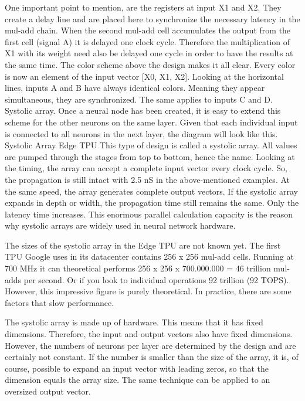   
One important point to mention, are the registers at input X1 and X2. They create a delay line and are placed here to synchronize the necessary latency in the mul-add chain. When the second mul-add cell accumulates the output from the first cell (signal A) it is delayed one clock cycle. Therefore the multiplication of X1 with its weight need also be delayed one cycle in order to have the results at the same time. The color scheme above the design makes it all clear. Every color is now an element of the input vector [X0, X1, X2]. Looking at the horizontal lines, inputs A and B have always identical colors. Meaning they appear simultaneous, they are synchronized. The same applies to inputs C and D.
Systolic array.
Once a neural node has been created, it is easy to extend this scheme for the other neurons on the same layer. Given that each individual input is connected to all neurons in the next layer, the diagram will look like this.
Systolic Array Edge TPU
This type of design is called a systolic array. All values are pumped through the stages from top to bottom, hence the name. Looking at the timing, the array can accept a complete input vector every clock cycle. So, the propagation is still intact with 2.5 nS in the above-mentioned examples. At the same speed, the array generates complete output vectors. If the systolic array expands in depth or width, the propagation time still remains the same. Only the latency time increases. This enormous parallel calculation capacity is the reason why systolic arrays are widely used in neural network hardware.
 
The sizes of the systolic array in the Edge TPU are not known yet. The first TPU Google uses in its datacenter contains 256 x 256 mul-add cells. Running at 700 MHz it can theoretical performs 256 x 256 x 700.000.000 = 46 trillion mul-adds per second. Or if you look to individual operations 92 trillion (92 TOPS). However, this impressive figure is purely theoretical. In practice, there are some factors that slow performance.
 
The systolic array is made up of hardware. This means that it has fixed dimensions. Therefore, the input and output vectors also have fixed dimensions. However, the numbers of neurons per layer are determined by the design and are certainly not constant. If the number is smaller than the size of the array, it is, of course, possible to expand an input vector with leading zeros, so that the dimension equals the array size. The same technique can be applied to an oversized output vector.


